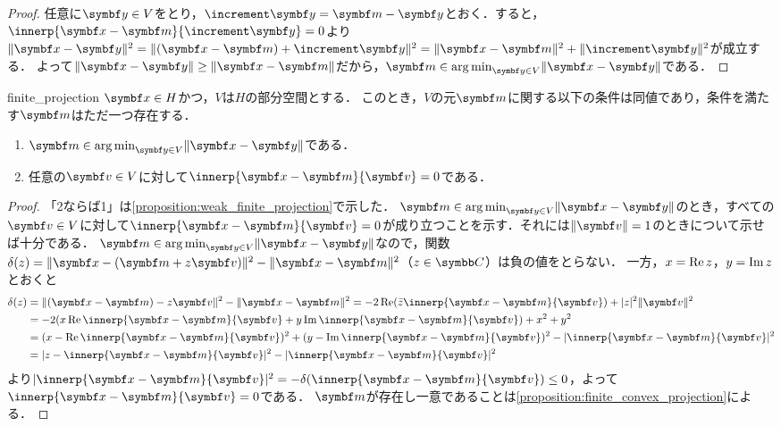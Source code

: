 \documentclass[../../main]{subfiles}
\begin{document}
\begin{proof}
  任意に\(\vect{y}\in V\)をとり，\(\increment\vect{y}=\vect{m}-\vect{y}\)とおく．すると，\(\innerp{\vect{x}-\vect{m}}{\increment\vect{y}}=0\)より
  \(\vnorm{\vect{x}-\vect{y}}^2=\vnorm{(\vect{x}-\vect{m})+\increment\vect{y}}^2=\vnorm{\vect{x}-\vect{m}}^2+\vnorm{\increment\vect{y}}^2\)が成立する．
  よって\(\vnorm{\vect{x}-\vect{y}}\geq\vnorm{\vect{x}-\vect{m}}\)だから，\(\vect{m}\in\argmin_{\vect{y}\in V}\vnorm{\vect{x}-\vect{y}}\)である．
\end{proof}

\begin{proposition}{}{finite_projection}
  \(\vect{x}\in H\)かつ，\(V\)は\(H\)の部分空間とする．
  このとき，\(V\)の元\(\vect{m}\)に関する以下の条件は同値であり，条件を満たす\(\vect{m}\)はただ一つ存在する．
  \begin{enumerate}
    \item \(\vect{m}\in\argmin_{\vect{y}\in V}\vnorm{\vect{x}-\vect{y}}\)である．
    \item 任意の\(\vect{v}\in V\)に対して\(\innerp{\vect{x}-\vect{m}}{\vect{v}}=0\)である．
  \end{enumerate}
\end{proposition}

\begin{proof}
  「2ならば1」は\cref{proposition:weak_finite_projection}で示した．
  \(\vect{m}\in\argmin_{\vect{y}\in V}\vnorm{\vect{x}-\vect{y}}\)のとき，すべての\(\vect{v}\in V\)に対して\(\innerp{\vect{x}-\vect{m}}{\vect{v}}=0\)が成り立つことを示す．それには\(\vnorm{\vect{v}}=1\)のときについて示せば十分である．
  \(\vect{m}\in\argmin_{\vect{y}\in V}\vnorm{\vect{x}-\vect{y}}\)なので，関数\(\delta(z)=\vnorm{\vect{x}-(\vect{m}+z\vect{v})}^2-\vnorm{\vect{x}-\vect{m}}^2\)（\(z\in\numset{C}\)）は負の値をとらない．
  一方，\(x=\operatorname{Re} z\)，\(y=\operatorname{Im} z\)とおくと
  \begin{align*}
    \delta(z) &= \vnorm{(\vect{x}-\vect{m})-z\vect{v}}^2-\vnorm{\vect{x}-\vect{m}}^2
    = -2\rpart(\conj{z}\innerp{\vect{x}-\vect{m}}{\vect{v}})+\abs{z}^2\vnorm{\vect{v}}^2 \\
    &= -2(x\rpart\innerp{\vect{x}-\vect{m}}{\vect{v}}+y\ipart\innerp{\vect{x}-\vect{m}}{\vect{v}})+x^2+y^2 \\
    &= (x-\rpart\innerp{\vect{x}-\vect{m}}{\vect{v}})^2+(y-\ipart\innerp{\vect{x}-\vect{m}}{\vect{v}})^2-\abs{\innerp{\vect{x}-\vect{m}}{\vect{v}}}^2 \\
    &= \abs{z-\innerp{\vect{x}-\vect{m}}{\vect{v}}}^2-\abs{\innerp{\vect{x}-\vect{m}}{\vect{v}}}^2
  \end{align*}
  より\(\abs{\innerp{\vect{x}-\vect{m}}{\vect{v}}}^2=-\delta(\innerp{\vect{x}-\vect{m}}{\vect{v}})\leq 0\)，よって\(\innerp{\vect{x}-\vect{m}}{\vect{v}}=0\)である．
  \(\vect{m}\)が存在し一意であることは\cref{proposition:finite_convex_projection}による．
\end{proof}
\end{document}
